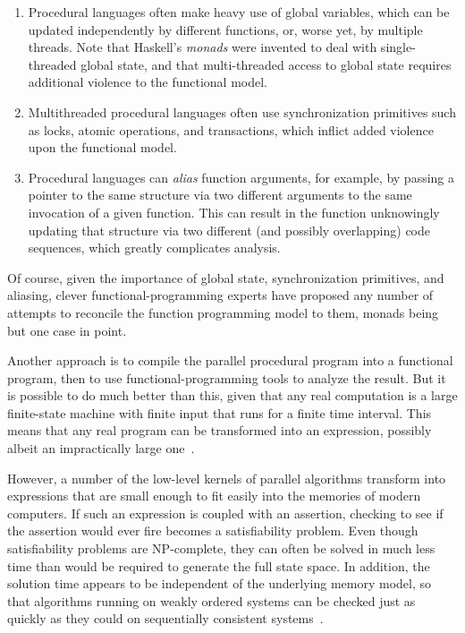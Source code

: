 \begin{enumerate}
\item	Procedural languages often make heavy use of global variables,
	which can be updated independently by different
	functions, or, worse yet, by multiple threads.
	Note that Haskell's \emph{monads} were invented to deal with
	single-threaded global state, and that multi-threaded access to
	global state requires additional violence to the functional model.
\item	Multithreaded procedural languages often use synchronization
	primitives such as locks, atomic operations, and transactions,
	which inflict added violence upon the functional model.
\item	Procedural languages can \emph{alias} function arguments,
	for example, by passing a pointer to the same structure via two
	different arguments to the same invocation of a given function.
	This can result in the function unknowingly updating that
	structure via two different (and possibly overlapping) code
	sequences, which greatly complicates analysis.
\end{enumerate}

Of course, given the importance of global state, synchronization
primitives, and aliasing, clever functional-programming experts have
proposed any number of attempts to reconcile the function programming
model to them, monads being but one case in point.

Another approach is to compile the parallel procedural program into
a functional program, then to use functional-programming tools to analyze
the result.
But it is possible to do much better than this, given that any real
computation is a large finite-state machine with finite input that
runs for a finite time interval.
This means that any real program can be transformed into an expression,
possibly albeit an impractically large one~\cite{VijayDSilva2012-sas}.

However, a number of the low-level kernels of parallel algorithms transform
into expressions that are small enough to fit easily into the memories
of modern computers.
If such an expression is coupled with an assertion, checking to see if
the assertion would ever fire becomes a satisfiability problem.
Even though satisfiability problems are NP-complete, they can often
be solved in much less time than would be required to generate the
full state space.
In addition, the solution time appears to be independent of the underlying
memory model, so that algorithms running on weakly ordered systems
can be checked just as quickly as they could on sequentially consistent
systems~\cite{JadeAlglave2013-cav}.


